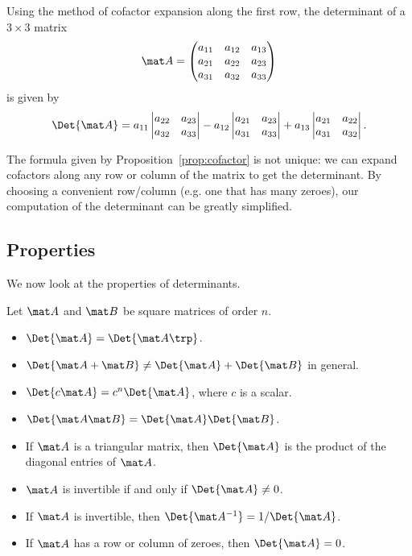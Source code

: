 \begin{example}
    Using the method of cofactor expansion along the first row, the determinant of a $3 \times 3$ matrix \[\mat A = \begin{pmatrix}a_{11} & a_{12} & a_{13} \\ a_{21} & a_{22} & a_{23} \\ a_{31} & a_{32} & a_{33}\end{pmatrix}\] is given by \[\Det{\mat A} = a_{11} \begin{vmatrix}a_{22} & a_{23} \\ a_{32} & a_{33}\end{vmatrix} - a_{12} \begin{vmatrix}a_{21} & a_{23} \\ a_{31} & a_{33}\end{vmatrix} + a_{13} \begin{vmatrix}a_{21} & a_{22} \\ a_{31} & a_{32}\end{vmatrix}.\]
\end{example}

The formula given by Proposition~\ref{prop:cofactor} is not unique: we can expand cofactors along any row or column of the matrix to get the determinant. By choosing a convenient row/column (e.g. one that has many zeroes), our computation of the determinant can be greatly simplified.

\subsection{Properties}

We now look at the properties of determinants.

\begin{fact}
    Let $\mat A$ and $\mat B$ be square matrices of order $n$.
    \begin{itemize}
        \item $\Det{\mat A} = \Det{\mat A \trp}$.
        \item $\Det{\mat A + \mat B} \neq \Det{\mat A} + \Det{\mat B}$ in general.
        \item $\Det{c \mat A} = c^n \Det{\mat A}$, where $c$ is a scalar.
        \item $\Det{\mat A \mat B} = \Det{\mat A} \Det{\mat B}$.
        \item If $\mat A$ is a triangular matrix, then $\Det{\mat A}$ is the product of the diagonal entries of $\mat A$.
        \item $\mat A$ is invertible if and only if $\Det{\mat A} \neq 0$.
        \item If $\mat A$ is invertible, then $\Det{\mat A^{-1}} = 1/\Det{\mat A}$.
        \item If $\mat A$ has a row or column of zeroes, then $\Det{\mat A} = 0$.
    \end{itemize}
\end{fact}

